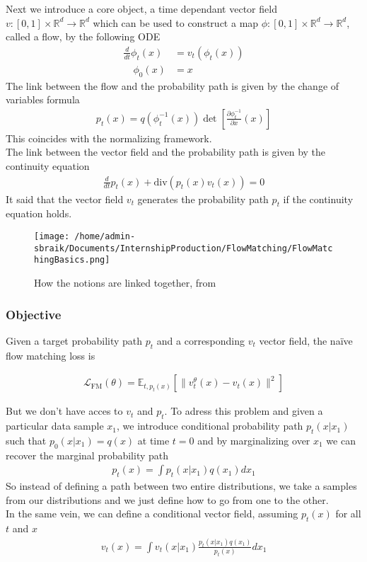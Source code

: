 \documentclass{article}
\begin{document}
\newpage

Next we introduce a core object, a time dependant vector field \(v:[0,1]\times \mathbb{R}^d\rightarrow\mathbb{R}^d\) which can be used to construct a map \(\phi:[0,1]\times\mathbb{R}^d\rightarrow\mathbb{R}^d\), called a flow, by the following ODE
\begin{align}
    \frac{d}{dt}\phi_t(x)&=v_t(\phi_t(x))\\
    \quad \phi_0(x)&=x \nonumber
\end{align}  
The link between the flow and the probability path is given by the change of variables formula 
\begin{align}
    p_t(x)=q(\phi_t^{-1}(x))\det \left[\frac{\partial\phi_t^{-1}}{\partial x}(x)\right]
\end{align}
This coincides with the normalizing framework. \\
The link between the vector field and the probability path is given by the continuity equation 
\begin{align}
  \frac{d}{dt}p_t(x)+\text{div}(p_t(x)v_t(x))=0
\end{align}
It said that the vector field \(v_t\) generates the probability path \(p_t\) if the continuity equation holds.\\
\bigskip
\begin{figure}[h]
    \centering
    \texttt{[image: /home/admin-sbraik/Documents/InternshipProduction/FlowMatching/FlowMatchingBasics.png]}
    \caption{How the notions are linked together, from \cite{lipman2024flowmatchingguidecode}}
    \label{fig:flow_matching_basics}
\end{figure}

\subsubsection{Objective}
Given a target probability path \(p_t\) and a corresponding \(v_t\) vector field, the naïve flow matching loss is 

\begin{align}
    \mathcal{L}_\text{FM}(\theta) = \mathbb{E}_{t,p_t(x)}\left[\|v_t^\theta(x)-v_t(x)\|^2\right]
\end{align}

But we don't have acces to \(v_t\) and \(p_t\). To adress this problem and given a particular data sample \(x_1\), we introduce conditional probability path \(p_t(x|x_1)\) such that \(p_0(x|x_1)=q(x)\) at time \(t=0\) and by marginalizing over \(x_1\) we can recover the marginal probability path  
\begin{align}
  p_t(x)=\int p_t(x|x_1)q(x_1)dx_1
\end{align}
So instead of defining a path between two entire distributions, we take a samples from our distributions and we just define how to go from one to the other.\\ 
In the same vein, we can define a conditional vector field, assuming \(p_t(x)\) for all \(t\) and \(x\) 
\begin{align}
  v_t(x)=\int v_t(x|x_1)\frac{p_t(x|x_1)q(x_1)}{p_t(x)}dx_1
\end{align}
\end{document}
